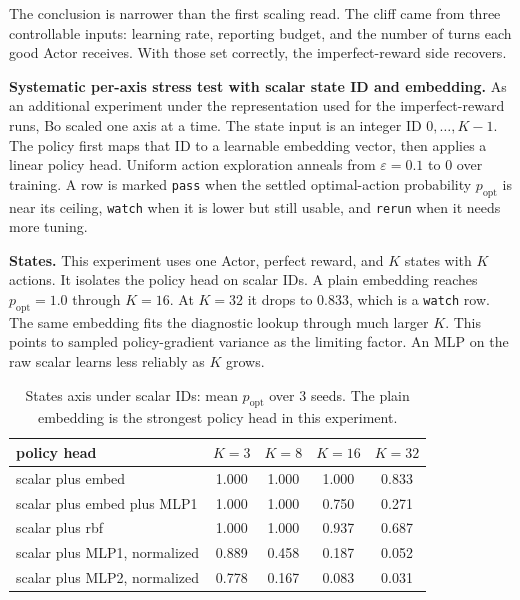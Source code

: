 \documentclass[11pt]{article}
\begin{document}
The conclusion is narrower than the first scaling read. The cliff came from
three controllable inputs: learning rate, reporting budget, and the number of
turns each good Actor receives. With those set correctly, the imperfect-reward
side recovers.

\textbf{Systematic per-axis stress test with scalar state ID and embedding.}
As an additional experiment under the representation used for the imperfect-reward runs,
Bo scaled one axis at a time. The state input is an integer ID
\(0,\ldots,K-1\). The policy first maps that ID to a learnable embedding vector,
then applies a linear policy head. Uniform action exploration anneals from
\(\varepsilon=0.1\) to \(0\) over training. A row is marked
\texttt{pass} when the settled optimal-action probability \(p_{\mathrm{opt}}\)
is near its ceiling, \texttt{watch} when it is lower but still usable, and
\texttt{rerun} when it needs more tuning.

\textbf{States.} This experiment uses one Actor, perfect reward, and \(K\) states
with \(K\) actions. It isolates the policy head on scalar IDs. A plain embedding
reaches \(p_{\mathrm{opt}}=1.0\) through \(K=16\). At \(K=32\) it drops to
\(0.833\), which is a \texttt{watch} row. The same embedding fits the diagnostic
lookup through much larger \(K\). This points to sampled policy-gradient
variance as the limiting factor. An MLP on the raw scalar learns less reliably
as \(K\) grows.

\begin{table}[H]
\centering
\small
\begin{tabular}{lcccc}
\toprule
policy head & \(K=3\) & \(K=8\) & \(K=16\) & \(K=32\) \\
\midrule
scalar plus embed       & 1.000 & 1.000 & 1.000 & 0.833 \\
scalar plus embed plus MLP1  & 1.000 & 1.000 & 0.750 & 0.271 \\
scalar plus rbf         & 1.000 & 1.000 & 0.937 & 0.687 \\
scalar plus MLP1, normalized & 0.889 & 0.458 & 0.187 & 0.052 \\
scalar plus MLP2, normalized & 0.778 & 0.167 & 0.083 & 0.031 \\
\bottomrule
\end{tabular}
\caption{States axis under scalar IDs: mean \(p_{\mathrm{opt}}\) over 3 seeds.
The plain embedding is the strongest policy head in this experiment.}
\label{tab:appendix-ir-stress-states}
\end{table}
\end{document}
